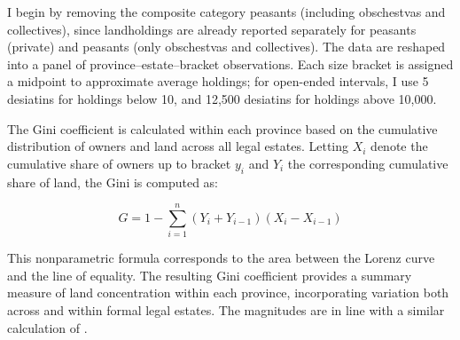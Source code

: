 \documentclass[11pt]{scrarticle}
\begin{document}
I begin by removing the composite category peasants (including obschestvas and collectives), since landholdings are already reported separately for peasants (private) and peasants (only obschestvas and collectives). The data are reshaped into a panel of province–estate–bracket observations. Each size bracket is assigned a midpoint to approximate average holdings; for open-ended intervals, I use 5 desiatins for holdings below 10, and 12,500 desiatins for holdings above 10,000.

The Gini coefficient is calculated within each province based on the cumulative distribution of owners and land across all legal estates. Letting $X_i$ denote the cumulative share of owners up to bracket $y_i$ and $Y_i$ the corresponding cumulative share of land, the Gini is computed as:

\begin{equation}
G = 1 - \sum_{i=1}^{n} (Y_i + Y_{i-1})(X_i - X_{i-1})
\end{equation}

This nonparametric formula corresponds to the area between the Lorenz curve and the line of equality. The resulting Gini coefficient provides a summary measure of land concentration within each province, incorporating variation both across and within formal legal estates. The magnitudes are in line with a similar calculation of \cite{lindert_russian_2014}. 
\end{document}
